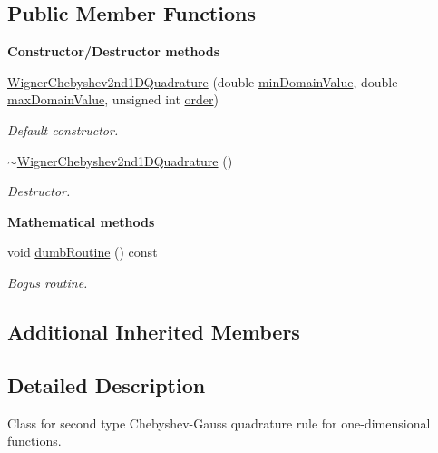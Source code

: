 \subsection*{Public Member Functions}
\begin{Indent}{\bf Constructor/\-Destructor methods}\par
\begin{DoxyCompactItemize}
\item 
\hyperlink{class_q_u_e_s_o_1_1_wigner_chebyshev2nd1_d_quadrature_ada00887a7e9ad33a5ea4bf60a5f4ae81}{Wigner\-Chebyshev2nd1\-D\-Quadrature} (double \hyperlink{class_q_u_e_s_o_1_1_base1_d_quadrature_a938187458b0069e7b3779bc3739a1cc0}{min\-Domain\-Value}, double \hyperlink{class_q_u_e_s_o_1_1_base1_d_quadrature_af3d09abe6716a23f9061b8b657524547}{max\-Domain\-Value}, unsigned int \hyperlink{class_q_u_e_s_o_1_1_base1_d_quadrature_a07713b5e8df24bbc8e3e9d13b707e5d0}{order})
\begin{DoxyCompactList}\small\item\em Default constructor. \end{DoxyCompactList}\item 
\hyperlink{class_q_u_e_s_o_1_1_wigner_chebyshev2nd1_d_quadrature_aa7013fc823f0e4ad0ab9ccaf588551f5}{$\sim$\-Wigner\-Chebyshev2nd1\-D\-Quadrature} ()
\begin{DoxyCompactList}\small\item\em Destructor. \end{DoxyCompactList}\end{DoxyCompactItemize}
\end{Indent}
\begin{Indent}{\bf Mathematical methods}\par
\begin{DoxyCompactItemize}
\item 
void \hyperlink{class_q_u_e_s_o_1_1_wigner_chebyshev2nd1_d_quadrature_a1be91acea2adbbaf5f61a408d66737fb}{dumb\-Routine} () const 
\begin{DoxyCompactList}\small\item\em Bogus routine. \end{DoxyCompactList}\end{DoxyCompactItemize}
\end{Indent}
\subsection*{Additional Inherited Members}


\subsection{Detailed Description}
Class for second type Chebyshev-\/\-Gauss quadrature rule for one-\/dimensional functions. 

